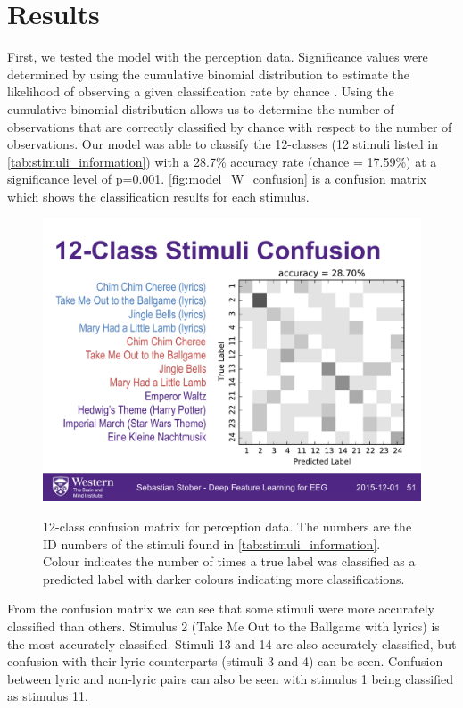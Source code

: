 \section{Results}
First, we tested the model with the perception data. 
Significance values were determined by using the cumulative binomial distribution to estimate the likelihood of observing a given classification rate by chance \cite{Combrisson2015}. 
Using the cumulative binomial distribution allows us to determine the number of observations that are correctly classified by chance with respect to the number of observations.
Our model was able to classify the 12-classes (12 stimuli listed in \autoref{tab:stimuli_information}) with a 28.7\% accuracy rate (chance = 17.59\%) at a significance level of p=0.001.
\autoref{fig:model_W_confusion} is a confusion matrix which shows the classification results for each stimulus.
\begin{figure}[htb] 
  \begin{center}
    \includegraphics[width=.75\textwidth,keepaspectratio=true]{Figures/model_W_confusion}
   \\\vspace{-0.8em}
    \caption{12-class confusion matrix for perception data. The numbers are the ID numbers of the stimuli found in \autoref{tab:stimuli_information}. Colour indicates the number of times a true label was classified as a predicted label with darker colours indicating more classifications.}
    \label{fig:model_W_confusion}
  \end{center}
\end{figure}
From the confusion matrix we can see that some stimuli were more accurately classified than others. 
Stimulus 2 (Take Me Out to the Ballgame with lyrics) is the most accurately classified. 
Stimuli 13 and 14 are also accurately classified, but confusion with their lyric counterparts (stimuli 3 and 4) can be seen.
Confusion between lyric and non-lyric pairs can also be seen with stimulus 1 being classified as stimulus 11.


